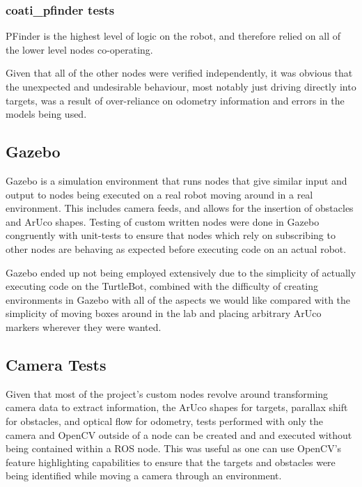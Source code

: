 \documentclass{article}[12]
\begin{document}
	\subsubsection{coati\_pfinder tests}
	
	PFinder is the highest level of logic on the robot, and therefore relied on all of the lower level nodes co-operating. 
	
	Given that all of the other nodes were verified independently, it was obvious that the unexpected and undesirable behaviour, most notably just driving directly into targets, was a result of over-reliance on odometry information and errors in the models being used. 
	
	\subsection{Gazebo}
	
	Gazebo is a simulation environment that runs nodes that give similar input and output to nodes being executed on a real robot moving around in a real environment. This includes camera feeds, and allows for the insertion of obstacles and ArUco shapes. Testing of custom written nodes were done in Gazebo congruently with unit-tests to ensure that nodes which rely on subscribing to other nodes are behaving as expected before executing code on an actual robot.
	
	Gazebo ended up not being employed extensively due to the simplicity of actually executing code on the TurtleBot, combined with the difficulty of creating environments in Gazebo with all of the aspects we would like compared with the simplicity of moving boxes around in the lab and placing arbitrary ArUco markers wherever they were wanted.
	
	\subsection{Camera Tests}
	
	Given that most of the project's custom nodes revolve around transforming camera data to extract information, the ArUco shapes for targets, parallax shift for obstacles, and optical flow for odometry, tests performed with only the camera and OpenCV outside of a node can be created and and executed without being contained within a ROS node. This was useful as one can use OpenCV's feature highlighting capabilities to ensure that the targets and obstacles were being identified while moving a camera through an environment. 
	
\end{document}
